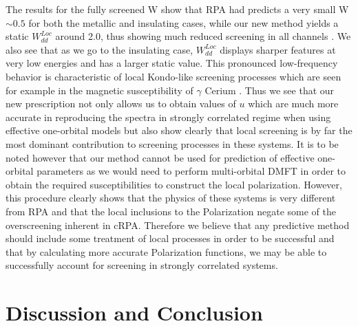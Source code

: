 \documentclass[10pt]{ruthesis}
\begin{document}
{The results for the fully screened W show that RPA  had predicts a very small W $\sim 0.5$ for both the metallic and insulating cases, while our new method yields a static $W^{Loc}_{dd}$ around 2.0, thus showing much reduced screening in all channels . We also see that as we go to the insulating case, $W^{Loc}_{dd}$ displays sharper features at very low energies and has a larger static value. This pronounced low-frequency behavior is characteristic of local Kondo-like screening processes which are seen for example in the magnetic susceptibility of $\gamma$ Cerium \cite{Chakrabarti_Cerium}. Thus we see that our new prescription not only allows us to obtain values of $u$ which are much more accurate in reproducing the spectra in strongly correlated regime when using effective one-orbital models but also show clearly that local screening is by far the most dominant contribution to screening processes in these systems. It is to be noted however that our method cannot be used for prediction of effective one-orbital parameters as we would need to perform multi-orbital DMFT in order to obtain the required susceptibilities to construct the local polarization. However, this procedure clearly shows that the physics of these systems is very different from RPA and that the local inclusions to the Polarization negate some of the overscreening inherent in cRPA. Therefore we believe that any predictive method should include some treatment of local processes in order to be successful and that by calculating more accurate Polarization functions, we may be able to successfully account for screening in strongly correlated systems.


\section{Discussion and Conclusion}


}
\end{document}
